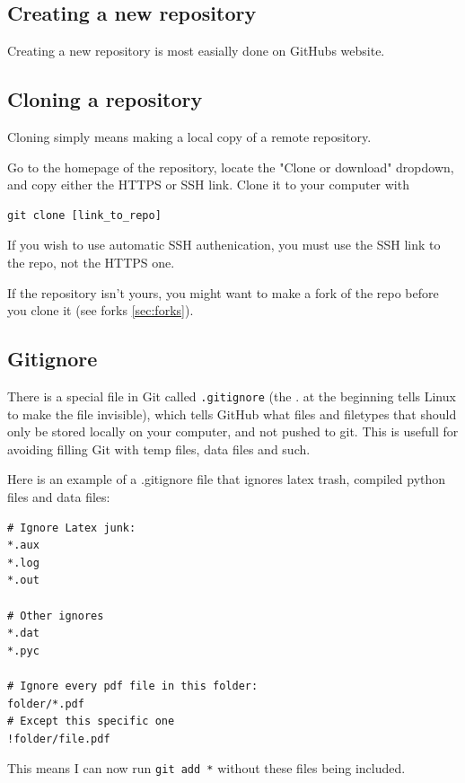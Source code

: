 \documentclass[12p,a4paper]{article}
\begin{document}
\subsection{Creating a new repository}
Creating a new repository is most easially done on GitHubs website. 


\subsection{Cloning a repository}
Cloning simply means making a local copy of a remote repository.

Go to the homepage of the repository, locate the "Clone or download" dropdown, and copy either the HTTPS or SSH link. Clone it to your computer with
\begin{verbatim}
git clone [link_to_repo]
\end{verbatim}
If you wish to use automatic SSH authenication, you must use the SSH link to the repo, not the HTTPS one.

If the repository isn't yours, you might want to make a fork of the repo before you clone it (see forks \ref{sec:forks}).


\subsection{Gitignore}
There is a special file in Git called \texttt{.gitignore} (the . at the beginning tells Linux to make the file invisible), which tells GitHub what files and filetypes that should only be stored locally on your computer, and not pushed to git. This is usefull for avoiding filling Git with temp files, data files and such.

Here is an example of a .gitignore file that ignores latex trash, compiled python files and data files:
\begin{lstlisting}
# Ignore Latex junk:
*.aux
*.log
*.out

# Other ignores
*.dat
*.pyc

# Ignore every pdf file in this folder:
folder/*.pdf
# Except this specific one
!folder/file.pdf
\end{lstlisting}
This means I can now run \texttt{git add *} without these files being included.



\newpage
\end{document}
